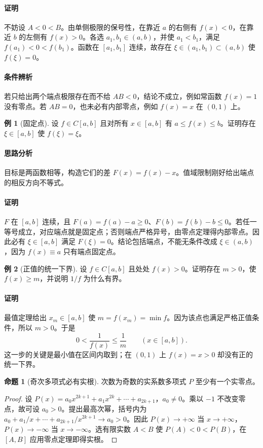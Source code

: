 \documentclass[UTF8,fontset=fandol,12pt,oneside,openany]{ctexrep}
\theoremstyle{definition}
\newtheorem{proposition}[theorem]{命题}
\newtheorem{example}{例}[chapter]
\begin{document}
\paragraph{证明}
不妨设 $A<0<B$。由单侧极限的保号性，在靠近 $a$ 的右侧有 $f(x)<0$，在靠近 $b$ 的左侧有 $f(x)>0$。各选 $a_1,b_1\in(a,b)$，并使 $a_1<b_1$，满足 $f(a_1)<0<f(b_1)$。函数在 $[a_1,b_1]$ 连续，故存在 $\xi\in(a_1,b_1)\subset(a,b)$ 使 $f(\xi)=0$。
\paragraph{条件辨析}
若只给出两个端点极限存在而不给 $AB<0$，结论不成立，例如常函数 $f(x)=1$ 没有零点。若 $AB=0$，也未必有内部零点，例如 $f(x)=x$ 在 $(0,1)$ 上。

\begin{example}[固定点]
设 $f\in C[a,b]$ 且对所有 $x\in[a,b]$ 有 $a\le f(x)\le b$。证明存在 $\xi\in[a,b]$ 使 $f(\xi)=\xi$。
\end{example}
\paragraph{思路分析}
目标是两函数相等，构造它们的差 $F(x)=f(x)-x$。值域限制刚好给出端点的相反方向不等式。
\paragraph{证明}
$F$ 在 $[a,b]$ 连续，且 $F(a)=f(a)-a\ge0$、$F(b)=f(b)-b\le0$。若任一等号成立，对应端点就是固定点；否则端点严格异号，由零点定理得内部零点。因此必有 $\xi\in[a,b]$ 满足 $F(\xi)=0$。结论包括端点，不能无条件改成 $\xi\in(a,b)$，因为 $f(x)\equiv a$ 只有端点固定点。

\begin{example}[正值的统一下界]
设 $f\in C[a,b]$ 且处处 $f(x)>0$。证明存在 $m>0$，使 $f(x)\ge m$，并说明 $1/f$ 为什么有界。
\end{example}
\paragraph{证明}
最值定理给出 $x_m\in[a,b]$ 使 $m=f(x_m)=\min f$。因为该点也满足严格正值条件，所以 $m>0$。于是
\[
 0<\frac1{f(x)}\le\frac1m\qquad(x\in[a,b]).
\]
这一步的关键是最小值在区间内取到；在 $(0,1)$ 上 $f(x)=x>0$ 却没有正的统一下界。

\begin{proposition}[奇次多项式必有实根]
次数为奇数的实系数多项式 $P$ 至少有一个实零点。
\end{proposition}
\begin{proof}
设 $P(x)=a_0x^{2k+1}+a_1x^{2k}+\cdots+a_{2k+1}$，$a_0\ne0$。乘以 $-1$ 不改变零点，故可设 $a_0>0$。提出最高次幂，括号内为 $a_0+a_1/x+\cdots+a_{2k+1}/x^{2k+1}\to a_0>0$。因此 $P(x)\to+\infty$ 当 $x\to+\infty$，$P(x)\to-\infty$ 当 $x\to-\infty$。选有限实数 $A<B$ 使 $P(A)<0<P(B)$，在 $[A,B]$ 应用零点定理即得实根。
\end{proof}
\end{document}
